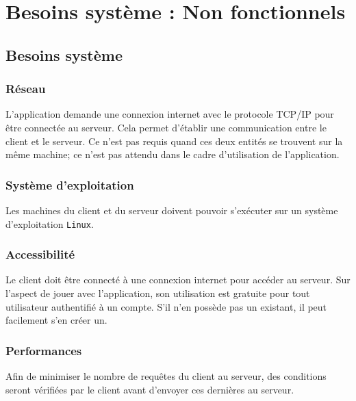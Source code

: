 \documentclass{article}
\begin{document}
\section{Besoins système : Non fonctionnels}

\subsection{Besoins système}

\subsubsection{Réseau}


L'application demande une connexion internet avec le protocole TCP/IP pour être connectée au serveur. Cela permet d'établir une communication entre le client et le serveur. Ce n'est pas requis quand ces deux entités se trouvent sur la même machine; ce n'est pas attendu dans le cadre d'utilisation de l'application.

\subsubsection{Système d'exploitation}

Les machines du client et du serveur doivent pouvoir s'exécuter sur un système d'exploitation \texttt{Linux}.

\subsubsection{Accessibilité}

Le client doit être connecté à une connexion internet pour accéder au serveur. Sur l'aspect de jouer avec l'application, son utilisation est gratuite pour tout utilisateur authentifié à un compte. S'il n'en possède pas un existant, il peut facilement s'en créer un. 

\subsubsection{Performances}


Afin de minimiser le nombre de requêtes du client au serveur, des conditions seront vérifiées par le client avant d'envoyer ces dernières au serveur. \\
\end{document}
